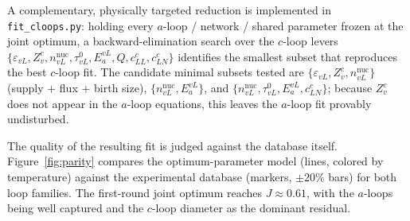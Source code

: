 \documentclass{article}
\begin{document}
A complementary, physically targeted reduction is implemented in
\texttt{fit\_cloops.py}: holding every $a$-loop / network / shared parameter
frozen at the joint optimum, a backward-elimination search over the $c$-loop
levers $\{\varepsilon_{vL},Z_v^c,n_{vL}^{\mathrm{nuc}},\tau^0_{vL},E^{vL}_a,Q,
c_{LL}^c,c_{LN}^c\}$ identifies the smallest subset that reproduces the best
$c$-loop fit. The candidate minimal subsets tested are
$\{\varepsilon_{vL},Z_v^c,n_{vL}^{\mathrm{nuc}}\}$ (supply $+$ flux $+$ birth
size), $\{n_{vL}^{\mathrm{nuc}},E^{vL}_a\}$, and
$\{n_{vL}^{\mathrm{nuc}},\tau^0_{vL},E^{vL}_a,c_{LN}^c\}$; because $Z_v^c$ does
not appear in the $a$-loop equations, this leaves the $a$-loop fit provably
undisturbed.

The quality of the resulting fit is judged against the database itself.
Figure~\ref{fig:parity} compares the optimum-parameter model (lines, colored by
temperature) against the experimental database (markers, $\pm20\%$ bars) for both
loop families. The first-round joint optimum reaches $J\approx0.61$, with the
$a$-loops being well captured and the $c$-loop diameter as the dominant residual.
\end{document}
